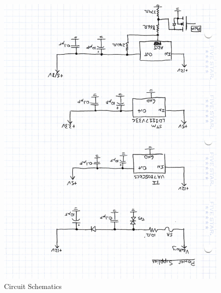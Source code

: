 \documentclass[12pt,letterpaper]{article}
\begin{document}
\begin{figure}[H]
\centering
\includegraphics[page=2, totalheight=20cm, angle=180]{images/circuit_sch.pdf}
\caption{Circuit Schematics}
\label{fig: image}
\end{figure}
\end{document}
